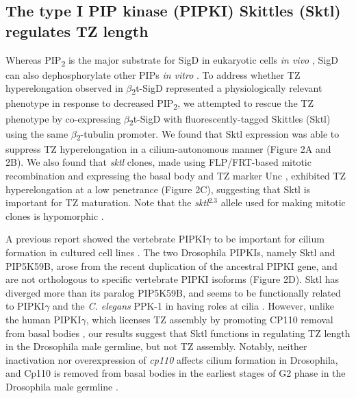 \documentclass[12pt, twoside, letterpaper]{article}
\newcommand{\PIP}{PIP\textsubscript{2}}
\newcommand{\sigd}{$\beta$\textsubscript{2}t-SigD}
\begin{document}
\begin{doublespacing}
\begin{linenumbers}
    \subsection*{The type I PIP kinase (PIPKI) Skittles (Sktl) regulates TZ length}
    Whereas \PIP{} is the major substrate for SigD in eukaryotic cells \textit{in vivo}
    \citep{terebiznik2002elimination, zhou2001salmonella, sengupta2013depletion},
    SigD can also dephosphorylate other PIPs \textit{in vitro}
    \citep{norris1998sopb}.
    To address whether TZ hyperelongation observed in \sigd{} represented a
    physiologically relevant phenotype in response to decreased \PIP{},
    we attempted to rescue the TZ phenotype by
    co-expressing \sigd{} with
    fluorescently-tagged Skittles (Sktl)
    using the same $\beta$\textsubscript{2}-tubulin promoter.
    We found that Sktl expression was able to suppress TZ hyperelongation
    in a cilium-autonomous manner (Figure 2A and 2B).
    We also found that \textit{sktl} clones, made
    using FLP/FRT-based mitotic recombination and expressing the
    basal body and TZ marker Unc
    \citep{baker2004mechanosensory, wei2008depletion},
    exhibited TZ hyperelongation at a low penetrance (Figure 2C),
    suggesting that Sktl is important for TZ maturation.
    Note that the \textit{sktl}$^{2.3}$ allele used for making mitotic clones
    is hypomorphic \citep{gervais2008pip5k}.

    A previous report showed the vertebrate PIPKI$\gamma$ to be
    important for cilium formation in cultured cell lines
    \citep{xu2014pipkigamma}.
    The two Drosophila PIPKIs, namely Sktl and PIP5K59B,
    arose from the recent duplication of
    the ancestral PIPKI gene,
    and are not orthologous to specific vertebrate PIPKI isoforms (Figure 2D).
    Sktl has diverged more than its paralog PIP5K59B, and seems
    to be functionally related to PIPKI$\gamma$
    and the \textit{C. elegans} PPK-1 in having roles at cilia \citep{xu2014pipkigamma}.
    However, unlike the human PIPKI$\gamma$, which licenses TZ assembly
    by promoting CP110 removal from basal bodies \citep{xu2016phosphatidylinositol},
    our results suggest that Sktl functions in
    regulating TZ length in the Drosophila male germline,
    but not TZ assembly. 
    Notably, neither inactivation nor overexpression of \textit{cp110} affects
    cilium formation in Drosophila, and Cp110
    is removed from basal bodies in the earliest stages of G2 phase in the Drosophila male germline
    \citep{franz2013cp110}.
    

\end{linenumbers}
\end{doublespacing}
\end{document}
